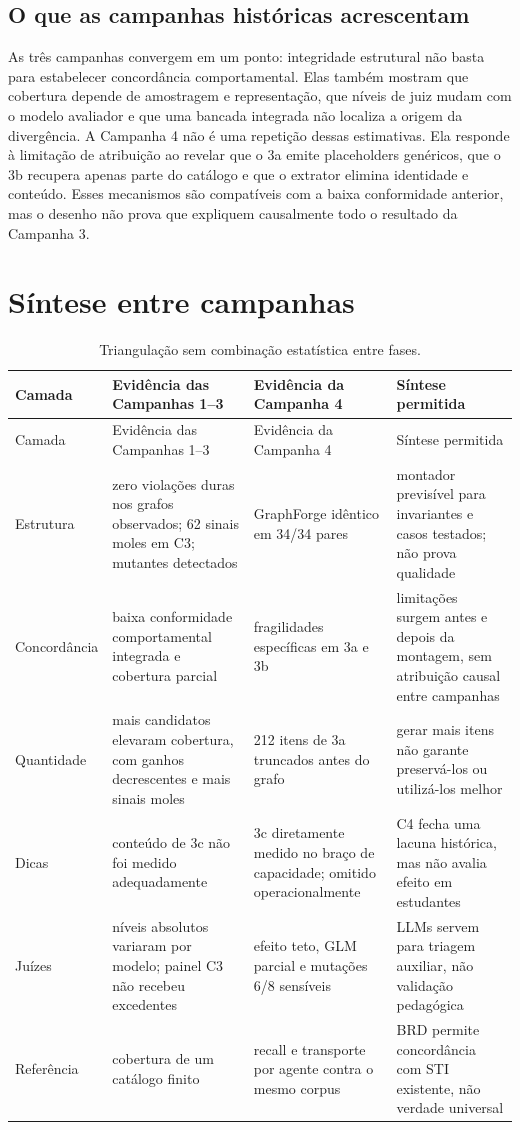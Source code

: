 \documentclass[11pt,a4paper]{article}
\begin{document}
\subsection{O que as campanhas históricas acrescentam}

As três campanhas convergem em um ponto: integridade estrutural não basta para estabelecer concordância comportamental. Elas também mostram que cobertura depende de amostragem e representação, que níveis de juiz mudam com o modelo avaliador e que uma bancada integrada não localiza a origem da divergência. A Campanha 4 não é uma repetição dessas estimativas. Ela responde à limitação de atribuição ao revelar que o 3a emite placeholders genéricos, que o 3b recupera apenas parte do catálogo e que o extrator elimina identidade e conteúdo. Esses mecanismos são compatíveis com a baixa conformidade anterior, mas o desenho não prova que expliquem causalmente todo o resultado da Campanha 3.

\section{Síntese entre campanhas}

\begingroup
\small
\setlength{\tabcolsep}{3pt}
\begin{longtable}{@{}P{2.3cm}P{4.35cm}P{4.35cm}P{3.65cm}@{}}
\caption{Triangulação sem combinação estatística entre fases.}\label{tab:triangulation}\\
\toprule
Camada & Evidência das Campanhas 1--3 & Evidência da Campanha 4 & Síntese permitida \\
\midrule
\endfirsthead
\toprule
Camada & Evidência das Campanhas 1--3 & Evidência da Campanha 4 & Síntese permitida \\
\midrule
\endhead
Estrutura & zero violações duras nos grafos observados; 62 sinais moles em C3; mutantes detectados & GraphForge idêntico em 34/34 pares & montador previsível para invariantes e casos testados; não prova qualidade \\
Concordância & baixa conformidade comportamental integrada e cobertura parcial & fragilidades específicas em 3a e 3b & limitações surgem antes e depois da montagem, sem atribuição causal entre campanhas \\
Quantidade & mais candidatos elevaram cobertura, com ganhos decrescentes e mais sinais moles & 212 itens de 3a truncados antes do grafo & gerar mais itens não garante preservá-los ou utilizá-los melhor \\
Dicas & conteúdo de 3c não foi medido adequadamente & 3c diretamente medido no braço de capacidade; omitido operacionalmente & C4 fecha uma lacuna histórica, mas não avalia efeito em estudantes \\
Juízes & níveis absolutos variaram por modelo; painel C3 não recebeu excedentes & efeito teto, GLM parcial e mutações 6/8 sensíveis & LLMs servem para triagem auxiliar, não validação pedagógica \\
Referência & cobertura de um catálogo finito & recall e transporte por agente contra o mesmo corpus & BRD permite concordância com STI existente, não verdade universal \\
\bottomrule
\end{longtable}
\endgroup
\end{document}
